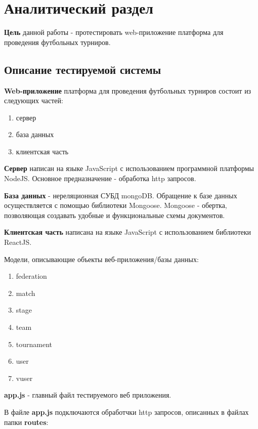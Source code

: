 \chapter{Аналитический раздел}

\textbf{Цель} данной работы - протестировать web-приложение платформа для проведения футбольных турниров.

\section{Описание тестируемой системы}

\textbf{Web-приложение} платформа для проведения футбольных турниров состоит из следующих частей:
\begin{enumerate}
	\item сервер
	\item база данных
	\item клиентская часть
\end{enumerate}

\textbf{Сервер} написан на языке JavaScript с использованием программной платформы NodeJS. Основное предназначение - обработка http запросов.

\textbf{База данных} - нереляционная СУБД mongoDB. Обращение к базе данных осуществляется с помощью библиотеки Mongoose. Mongoose - обертка, позволяющая создавать удобные и функциональные схемы документов. 

\textbf{Клиентская часть} написана на языке JavaScript с использованием библиотеки ReactJS.

Модели, описывающие объекты веб-приложения/базы данных:
\begin{enumerate}
	\item federation
	\item match
	\item stage
	\item team
	\item tournament
	\item user
	\item vuser
\end{enumerate}

\textbf{app.js} - главный файл тестируемого веб приложения.

В файле \textbf{app.js} подключаются обработчки http запросов, описанных в файлах папки \textbf{routes}:


